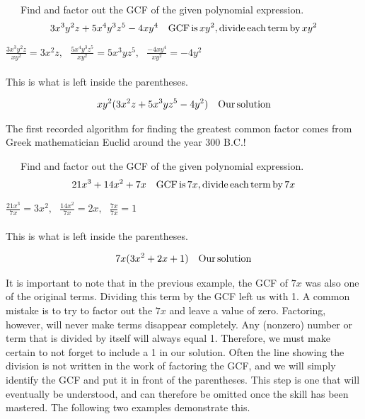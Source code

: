 \begin{example}~~~Find and factor out the GCF of the given polynomial expression.
  \begin{eqnarray*}
    3 x^3 y^2 z + 5 x^4 y^3 z^5 - 4 x y^4 &  & \tmop{GCF} \tmop{is} x y^2,
    \tmop{divide} \tmop{each} \tmop{term} \tmop{by} xy^2%
    \end{eqnarray*}
		\begin{center}
		$\displaystyle\frac{3 x^3 y^2 z}{x y^2} = 3 x^2 z,~~~ \displaystyle\frac{5 x^4 y^3 z^5}{x y^2} =
    5 x^3 y z^5,~~~ \displaystyle\frac{- 4 x y^4}{x y^2} = - 4 y^2$\\
		~\\
		This is what is left inside the parentheses.
		\end{center}
    \begin{eqnarray*}
    x y^2 (3 x^2 z + 5 x^3 y z^5 - 4 y^2) &  & \operatorname{Our} \operatorname{solution}
  \end{eqnarray*}
\end{example}
  
{} The first recorded algorithm for finding the
greatest common factor comes from Greek mathematician Euclid around the year
300 B.C.!

\begin{example}~~~Find and factor out the GCF of the given polynomial expression.
  \begin{eqnarray*}
    21 x^3 + 14 x^2 + 7 x &  & \operatorname{GCF} \operatorname{is} 7 x, \operatorname{divide}
    \operatorname{each} \operatorname{term} \operatorname{by} 7x
    \end{eqnarray*}
		\begin{center}
    $\displaystyle\frac{21 x^3}{7 x} = 3 x^2,~~~ \displaystyle\frac{14 x^2}{7 x} = 2 x,~~~ \displaystyle\frac{7 x}{7 x} = 1$\\
		~\\
		This is what is left inside the parentheses.
		\end{center}
  \begin{eqnarray*}
    7 x (3 x^2 + 2 x + 1) &  & \operatorname{Our} \operatorname{solution}
  \end{eqnarray*}
\end{example}

It is important to note that in the previous example, the GCF of $7 x$
was also one of the original terms.  Dividing this term by the GCF left us with 1. A common mistake is to try to factor out the $7 x$ and leave a value of zero.  Factoring, however, will never make terms disappear completely.  Any (nonzero) number or term that is divided by itself will always equal 1.  Therefore, we must make certain to not forget to include a 1 in our solution.\pp
Often the line showing the division is not written in the work of factoring the GCF, and we will simply identify the GCF and put it in front of the parentheses.  This step is one that will eventually be understood, and can therefore be omitted once the skill has been mastered.  The following two examples demonstrate this.


